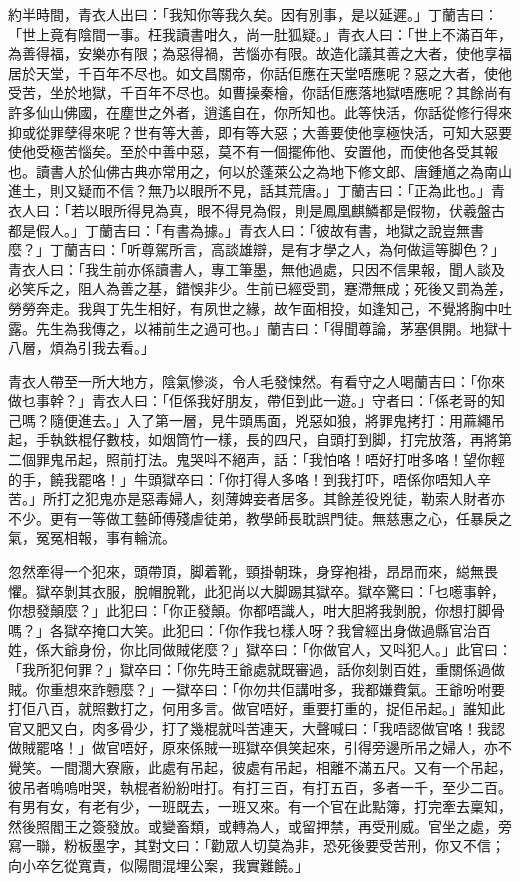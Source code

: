 \documentclass[a5paper, 12pt, openany]{book} %
\begin{document}
	約半時間，青衣人出曰：「我知你等我久矣。因有別事，是以延遲。」丁蘭吉曰：「世上竟有陰間一事。枉我讀書咁久，尚一肚狐疑。」青衣人曰：「世上不滿百年，為善得福，安樂亦有限；為惡得禍，苦惱亦有限。故造化議其善之大者，使他享福居於天堂，千百年不尽也。如文昌關帝，你話佢應在天堂唔應呢？惡之大者，使他受苦，坐於地獄，千百年不尽也。如曹操秦檜，你話佢應落地獄唔應呢？其餘尚有許多仙山佛國，在塵世之外者，逍遙自在，你所知也。此等快活，你話從修行得來抑或從罪孽得來呢？世有等大善，即有等大惡；大善要使他享極快活，可知大惡要使他受極苦惱矣。至於中善中惡，莫不有一個擺佈他、安置他，而使他各受其報也。讀書人於仙佛古典亦常用之，何以於蓬萊公之為地下修文郎、唐鍾馗之為南山進土，則又疑而不信？無乃以眼所不見，話其荒唐。」丁蘭吉曰：「正為此也。」青衣人曰：「若以眼所得見為真，眼不得見為假，則是鳳凰麒鱗都是假物，伏羲盤古都是假人。」丁蘭吉曰：「有書為據。」青衣人曰：「彼故有書，地獄之說豈無書麼？」丁蘭吉曰：「听尊駕所言，高談雄辯，是有才學之人，為何做這等脚色？」青衣人曰：「我生前亦係讀書人，專工筆墨，無他過處，只因不信果報，聞人談及必笑斥之，阻人為善之基，錯悞非少。生前已經受罰，蹇滯無成；死後又罰為差，勞勞奔走。我與丁先生相好，有夙世之緣，故乍面相投，如逢知己，不覺將胸中吐露。先生為我傳之，以補前生之過可也。」蘭吉曰：「得聞尊論，茅塞俱開。地獄十八層，煩為引我去看。」

	青衣人帶至一所大地方，陰氣慘淡，令人毛發悚然。有看守之人喝蘭吉曰：「你來做乜事幹？」青衣人曰：「佢係我好朋友，帶佢到此一遊。」守者曰：「係老哥的知己嗎？隨便進去。」入了第一層，見牛頭馬面，兇惡如狼，將罪鬼拷打：用蔴繩吊起，手執鉄棍仔數枝，如烟筒竹一樣，長的四尺，自頭打到脚，打完放落，再將第二個罪鬼吊起，照前打法。鬼哭呌不絕声，話：「我怕咯！唔好打咁多咯！望你輕的手，饒我罷咯！」牛頭獄卒曰：「你打得人多咯！到我打吓，唔係你唔知人辛苦。」所打之犯鬼亦是惡毒婦人，刻薄婢妾者居多。其餘差役兇徒，勒索人財者亦不少。更有一等做工藝師傅殘虐徒弟，教學師長耽誤門徒。無慈惠之心，任暴戾之氣，冤冤相報，事有輪流。

	忽然牽得一个犯來，頭帶頂，脚着靴，頸掛朝珠，身穿袍褂，昂昂而來，縂無畏懼。獄卒剝其衣服，脫帽脫靴，此犯尚以大脚踢其獄卒。獄卒驚曰：「乜㘃事幹，你想發顛麼？」此犯曰：「你正發顛。你都唔識人，咁大胆將我剝脫，你想打脚骨嗎？」各獄卒掩口大笑。此犯曰：「你作我乜樣人呀？我曾經出身做過縣官治百姓，係大爺身份，你比同做賊佬麼？」獄卒曰：「你做官人，又呌犯人。」此官曰：「我所犯何罪？」獄卒曰：「你先時王爺處就既審過，話你刻剝百姓，重關係過做賊。你重想來詐戅麼？」一獄卒曰：「你勿共佢講咁多，我都嫌費氣。王爺吩咐要打佢八百，就照數打之，何用多言。做官唔好，重要打重的，捉佢吊起。」誰知此官又肥又白，肉多骨少，打了幾棍就呌苦連天，大聲喊曰：「我唔認做官咯！我認做賊罷咯！」做官唔好，原來係賊一班獄卒俱笑起來，引得旁邊所吊之婦人，亦不覺笑。一間濶大寮廠，此處有吊起，彼處有吊起，相離不滿五尺。又有一个吊起，彼吊者嗚嗚咁哭，執棍者紛紛咁打。有打三百，有打五百，多者一千，至少二百。有男有女，有老有少，一班既去，一班又來。有一个官在此點簿，打完牽去稟知，然後照閻王之簽發放。或變畜類，或轉為人，或留押禁，再受刑威。官坐之處，旁寫一聯，粉板墨字，其對文曰：「勸眾人切莫為非，恐死後要受苦刑，你又不信；向小卒乞從寬責，似陽間混埋公案，我實難饒。」
\end{document}
